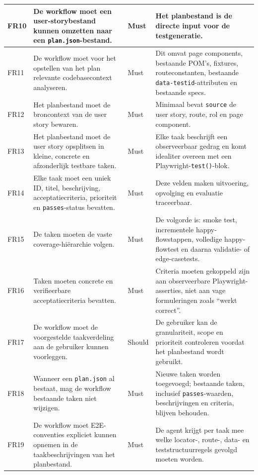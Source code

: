 \begin{longtable}{p{}p{}p{}p{}}
    FR10 & De workflow moet een user-storybestand kunnen omzetten naar een \texttt{plan.json}-bestand. & Must & Het planbestand is de directe input voor de testgeneratie. \\
    \midrule
    FR11 & De workflow moet voor het opstellen van het plan relevante codebasecontext analyseren. & Must & Dit omvat page components, bestaande POM's, fixtures, routeconstanten, bestaande \texttt{data-testid}-attributen en bestaande specs. \\
    \midrule
    FR12 & Het planbestand moet de broncontext van de user story bewaren. & Must & Minimaal bevat \texttt{source} de user story, route, rol en page component. \\
    \midrule
    FR13 & Het planbestand moet de user story opsplitsen in kleine, concrete en afzonderlijk testbare taken. & Must & Elke taak beschrijft een observeerbaar gedrag en komt idealiter overeen met een Playwright-\texttt{test()}-blok. \\
    \midrule
    FR14 & Elke taak moet een uniek ID, titel, beschrijving, acceptatiecriteria, prioriteit en \texttt{passes}-status bevatten. & Must & Deze velden maken uitvoering, opvolging en evaluatie traceerbaar. \\
    \midrule
    FR15 & De taken moeten de vaste coverage-hiërarchie volgen. & Must & De volgorde is: smoke test, incrementele happy-flowstappen, volledige happy-flowtest en daarna validatie- of edge-casetests. \\
    \midrule
    FR16 & Taken moeten concrete en verifieerbare acceptatiecriteria bevatten. & Must & Criteria moeten gekoppeld zijn aan observeerbare Playwright-asserties, niet aan vage formuleringen zoals ``werkt correct''. \\
    \midrule
    FR17 & De workflow moet de voorgestelde taakverdeling aan de gebruiker kunnen voorleggen. & Should & De gebruiker kan de granulariteit, scope en prioriteit controleren voordat het planbestand wordt gebruikt. \\
    \midrule
    FR18 & Wanneer een \texttt{plan.json} al bestaat, mag de workflow bestaande taken niet wijzigen. & Must & Nieuwe taken worden toegevoegd; bestaande taken, inclusief \texttt{passes}-waarden, beschrijvingen en criteria, blijven behouden. \\
    \midrule
    FR19 & De workflow moet E2E-conventies expliciet kunnen opnemen in de taakbeschrijvingen van het planbestand. & Must & De agent krijgt per taak mee welke locator-, route-, data- en teststructuurregels gevolgd moeten worden. \\

\end{longtable}
